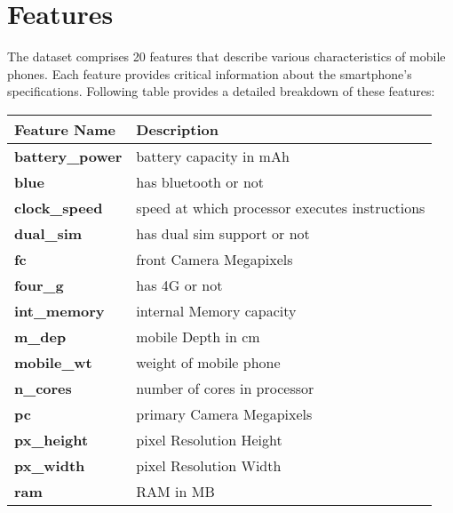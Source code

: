 \documentclass[12pt]{report}
\begin{document}
\section{Features}
The dataset comprises 20 features that describe various characteristics of mobile phones. Each feature provides critical information about the smartphone's specifications. Following table provides a detailed breakdown of these features:
\begin{table}[H]
	\begin{tabular}{ll}
		\toprule
		\textbf{Feature Name}   & \textbf{Description}                                            \\
		\toprule
		\textbf{battery\_power} & battery capacity in mAh                                         \\
		\midrule
		\textbf{blue}           & has bluetooth or not                                            \\
		\midrule
		\textbf{clock\_speed}   & speed at which processor executes instructions                  \\
		\midrule
		\textbf{dual\_sim}      & has dual sim support or not                                     \\
		\midrule
		\textbf{fc}             & front Camera Megapixels                                         \\
		\midrule
		\textbf{four\_g}        & has 4G or not                                                   \\
		\midrule
		\textbf{int\_memory}    & internal Memory capacity                                        \\
		\midrule
		\textbf{m\_dep}         & mobile Depth in cm                                              \\
		\midrule
		\textbf{mobile\_wt}     & weight of mobile phone                                          \\
		\midrule
		\textbf{n\_cores}       & number of cores in processor                                    \\
		\midrule
		\textbf{pc}             & primary Camera Megapixels                                       \\
		\midrule
		\textbf{px\_height}     & pixel Resolution Height                                         \\
		\midrule
		\textbf{px\_width}      & pixel Resolution Width                                          \\
		\midrule
		\textbf{ram}            & RAM in MB                                                       \\

\end{tabular}
\end{table}
\end{document}
